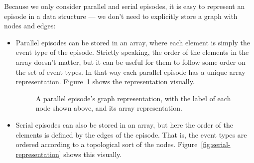 Because we only consider parallel and serial episodes, it is easy to represent an episode in a data structure --- we don't need to explicitly store a graph with nodes and edges:
\begin{itemize}
\item Parallel episodes can be stored in an array, where each element is simply the event type of the episode. Strictly speaking, the order of the elements in the array doesn't matter, but it can be useful for them to follow some order on the set of event types. In that way each parallel episode has a unique array representation. Figure~\ref{fig:parallel-representation} shows the representation visually.


\begin{figure}
\centering


\caption{A parallel episode's graph representation, with the label of each node shown above, and its array representation.}

\label{fig:parallel-representation}
\end{figure}

\item Serial episodes can also be stored in an array, but here the order of the elements is defined by the edges of the episode. That is, the event types are ordered according to a topological sort of the nodes. Figure~\ref{fig:serial-representation} shows this visually.
\end{itemize}

